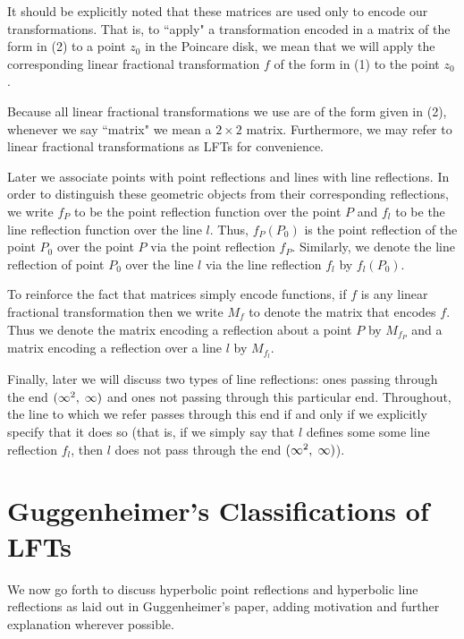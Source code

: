 \documentclass[12pt]{article}
\newcommand{\ttc}{, \hspace{1mm}}
\newcommand{\specialend}{(\infty^2\ttc\infty)}
\theoremstyle{plain}
\theoremstyle{definition}
\begin{document}
It should be explicitly noted that these matrices are used only to encode our transformations. That is, to ``apply" a transformation encoded in a matrix of the form in (2) to a point $z_0$ in the Poincare disk, we mean that we will apply the corresponding linear fractional transformation $f$ of the form in (1) to the point $z_0$. 

Because all linear fractional transformations we use are of the form given in (2), whenever we say ``matrix" we mean a $2 \times 2$ matrix. Furthermore, we may refer to linear fractional transformations as LFTs for convenience. 

Later we associate points with point reflections and lines with line reflections. In order to distinguish these geometric objects from their corresponding reflections, we write $f_P$ to be the point reflection function over the point $P$ and $f_l$ to be the line reflection function over the line $l$. Thus, $f_P(P_0)$ is the point reflection of the point $P_0$ over the point $P$ via the point reflection $f_P$. Similarly, we denote the line reflection of point $P_0$ over the line $l$ via the line reflection $f_l$ by $f_l(P_0)$.

To reinforce the fact that matrices simply encode functions, if $f$ is any linear fractional transformation then we write $M_f$ to denote the matrix that encodes $f$. Thus we denote the matrix encoding a reflection about a point $P$ by $M_{f_P}$ and a matrix encoding a reflection over a line $l$ by $M_{f_l}$. 

Finally, later we will discuss two types of line reflections: ones passing through the end $\specialend$ and ones not passing through this particular end. Throughout, the line to which we refer passes through this end if and only if we explicitly specify that it does so (that is, if we simply say that $l$ defines some some line reflection $f_l$, then $l$ does not pass through the end $\specialend$).

\section{Guggenheimer's Classifications of LFTs}

\hspace{10mm} We now go forth to discuss hyperbolic point reflections and hyperbolic line reflections as laid out in Guggenheimer's paper, adding motivation and further explanation wherever possible. 
\end{document}
